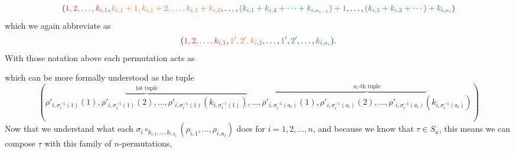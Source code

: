 \begin{example}
\[
    (
    \textcolor{Red}{1, 2, \dots, k_{i, 1}}, 
    \textcolor{Orange}{k_{i, 1} + 1, k_{i, 1} + 2, \dots, k_{i, 1} + k_{i, 2}},
    \dots, 
    \textcolor{RoyalBlue}{(k_{i, 1} + k_{i, 2} + \cdots + k_{i, a_{i-1}})+1},
    \dots,
    \textcolor{RoyalBlue}{(k_{i, 1} + k_{i, 2} + \cdots )+ k_{i, a_i}}
    )
\]
which we again abbreviate as 
\[
    (\textcolor{Red}{1, 2, \dots, k_{i, 1}}, 
    \textcolor{Orange}{1', 2', k_{i, 2}},
    \dots, 
    \textcolor{RoyalBlue}{1'},
    \textcolor{RoyalBlue}{2'},
    \dots,
    \textcolor{RoyalBlue}{k_{i, a_i}}).
\]
With those notation above each permutation acts as 
\begin{center}
\end{center}
which can be more formally understood as the tuple 
\begin{equation}\label{tuples}
    (
    \overbrace{\rho'_{i, \sigma_i^{-1}(1)}(1),
    \rho'_{i, \sigma_i^{-1}(1)}(2),
    \dots, 
    \rho'_{i, \sigma_i^{-1}(1)}(k_{i, \sigma_1^{-1}(1)})}^{1\text{st tuple}},
    \dots, 
    \overbrace{\rho'_{i, \sigma_i^{-1}(a_i)}(1),
    \rho'_{i, \sigma_i^{-1}(a_i)}(2),
    \dots, 
    \rho'_{i, \sigma_i^{-1}(a_i)}(k_{i, \sigma_i^{-1}(a_i)})}^{a_i\text{-th tuple}}
    )
\end{equation}
Now that we understand what each $\sigma_i \circ_{k_{i, 1}, \dots, k_{i, a_i}}(\rho_{i,1}, \dots, \rho_{i, a_i})$
does for $i = 1, 2, \dots, n$, and because we know that $\tau \in S_n$, 
this means we can compose $\tau$ with this family of $n$-permutations,

\end{example}
